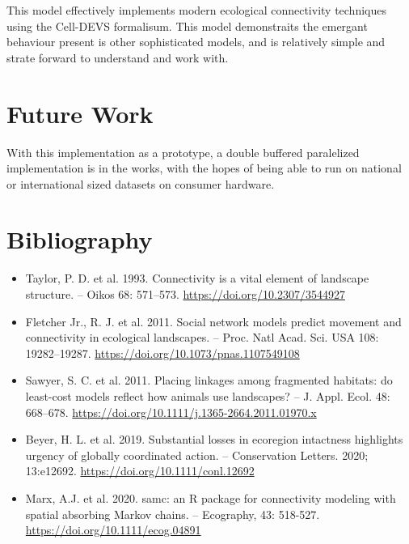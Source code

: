 \documentclass[twocolumn]{article}
\begin{document}
This model effectively implements modern ecological connectivity techniques using the Cell-DEVS formalisum. This model demonstraits the emergant behaviour present is other sophisticated models, and is relatively simple and strate forward to understand and work with. 

\section{Future Work}

With this implementation as a prototype, a double buffered paralelized implementation is in the works, with the hopes of being able to run on national or international sized datasets on consumer hardware. 

\section{Bibliography}

\begin{itemize}

\item Taylor, P. D. et al. 1993. Connectivity is a vital element of landscape
structure. – Oikos 68: 571–573. \url{
	https://doi.org/10.2307/3544927 }

\item Fletcher Jr., R. J. et al. 2011. Social network models predict movement and connectivity in ecological landscapes. – Proc. Natl
Acad. Sci. USA 108: 19282–19287. \url{https://doi.org/10.1073/pnas.1107549108}

\item Sawyer, S. C. et al. 2011. Placing linkages among fragmented habitats: do least-cost models reflect how animals use landscapes?
– J. Appl. Ecol. 48: 668–678. \url{https://doi.org/10.1111/j.1365-2664.2011.01970.x}

\item Beyer, H. L. et al. 2019. Substantial losses in ecoregion intactness highlights urgency of globally coordinated action. – Conservation Letters. 2020; 13:e12692. \url{https://doi.org/10.1111/conl.12692}

\item Marx, A.J. et al. 2020. samc: an R package for connectivity modeling with spatial absorbing Markov chains. – Ecography, 43: 518-527. \url{https://doi.org/10.1111/ecog.04891}

\end{itemize}
\end{document}
